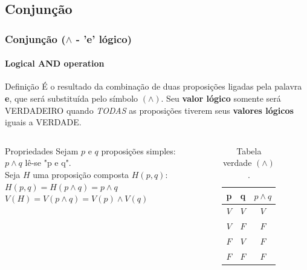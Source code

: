 \documentclass[10pt, headsepline, captions=tableabove, xcolor=table]{beamer}
\begin{document}
\subsection{Conjunção}
%

\begin{frame}[t]
    \frametitle{Conjunção ($\land$ - 'e' lógico)}
    \framesubtitle{Logical AND operation}
    \begin{block}{Definição}
        É o resultado da combinação de duas proposições ligadas pela palavra \textbf{e}, que será substituída pelo símbolo $(\land)$. Seu \textbf{valor lógico} somente será VERDADEIRO quando \emph{TODAS} as proposições tiverem seus \textbf{valores lógicos} iguais a VERDADE.
    \end{block}
    \vspace{-4mm}
    \begin{columns}[t]
        \begin{column}{0.58\textwidth}
            \begin{alertblock}{Propriedades}
                Sejam $p$ e $q$ proposições simples: \\[2pt]
                $p \land q$ lê-se "p e q". \\[2pt]
                Seja $H$ uma proposição composta $H(p,q)$: \\[2pt]
                $H(p,q) = H(p \land q) = p \land q$ \\[2pt]
                $V(H) = V(p \land q) = V(p) \land V(q)$
            \end{alertblock}
        \end{column}
        \hspace{-10mm}
        \begin{column}{0.4\textwidth}
            \vspace{-3mm}
            \begin{table}[t]
                \caption{Tabela verdade $(\land)$.}
                \label{tab:table-and}
                \begin{tabular}{|c|c|c|}
                \hline
                \rowcolor[HTML]{EFEFEF} 
                \textbf{p} & \textbf{q} & \textbf{$p \land q$} \\ \hline
                $V$          & $V$          & $V$                    \\ \hline
                $V$          & $F$          & $F$                    \\ \hline
                $F$          & $V$          & $F$                   \\ \hline
                $F$          & $F$          & $F$                    \\ \hline
                \end{tabular}
            \end{table}
        \end{column}
    \end{columns}
\end{frame}
\end{document}
